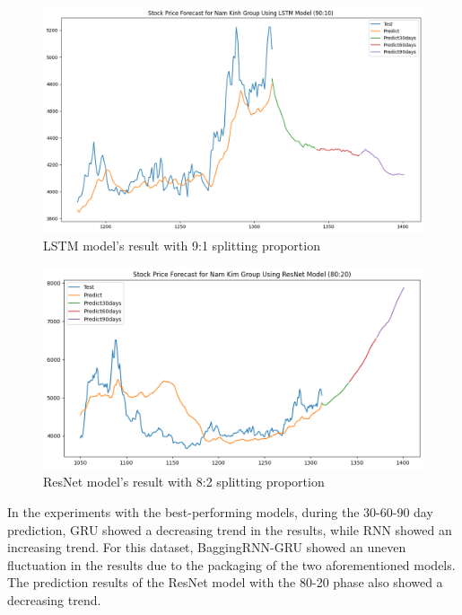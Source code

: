 \documentclass{ieeeojies}
\begin{document}
\begin{figure}[H]
  \centering
  \begin{minipage}{0.8\linewidth}
    \centering
        \includegraphics[width=\linewidth]{bibliography/LSTM_NKG_90-10.png}
    \caption{LSTM model's result with 9:1 splitting proportion}
    \label{fig28}
  \end{minipage}
\end{figure}
\begin{figure}[H]
  \centering
  \begin{minipage}{0.8\linewidth}
    \centering
        \includegraphics[width=\linewidth]{bibliography/ResNet_NKG_80-20.png}
    \caption{ResNet model's result with 8:2 splitting proportion}
    \label{fig28}
  \end{minipage}
\end{figure}
In the experiments with the best-performing models, during the 30-60-90 day prediction, GRU showed a decreasing trend in the results, while RNN showed an increasing trend. For this dataset, BaggingRNN-GRU showed an uneven fluctuation in the results due to the packaging of the two aforementioned models. The prediction results of the ResNet model with the 80-20 phase also showed a decreasing trend.
\end{document}
